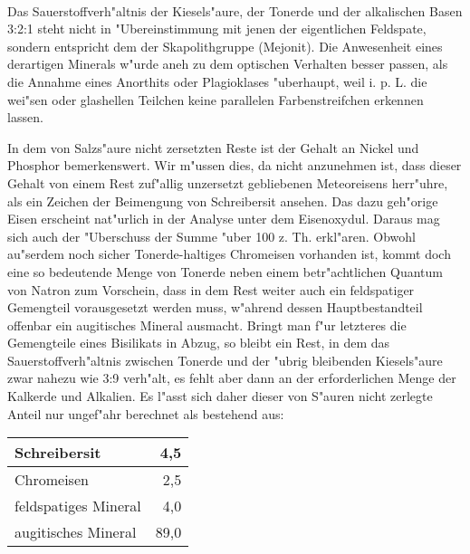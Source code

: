 \documentclass[a4paper, 11pt, oneside]{article}
\begin{document}
\paragraph{}
Das Sauerstoffverh"altnis der Kiesels"aure, der Tonerde und der alkalischen Basen 3:2:1 steht nicht in "Ubereinstimmung mit jenen der eigentlichen Feldspate, sondern entspricht dem der Skapolithgruppe (Mejonit). Die Anwesenheit eines derartigen Minerals w"urde aneh zu dem optischen Verhalten besser passen, als die Annahme eines Anorthits oder Plagioklases "uberhaupt, weil i. p. L. die wei"sen oder glashellen Teilchen keine parallelen Farbenstreifchen erkennen lassen.

In dem von Salzs"aure nicht zersetzten Reste ist der Gehalt an Nickel und Phosphor bemerkenswert. Wir m"ussen dies, da nicht anzunehmen ist, dass dieser Gehalt von einem Rest zuf"allig unzersetzt gebliebenen Meteoreisens herr"uhre, als ein Zeichen der Beimengung von Schreibersit ansehen. Das dazu geh"orige Eisen erscheint nat"urlich in der Analyse unter dem Eisenoxydul. Daraus mag sich auch der "Uberschuss der Summe "uber 100 z. Th. erkl"aren. Obwohl au"serdem noch sicher Tonerde-haltiges Chromeisen vorhanden ist, kommt doch eine so bedeutende Menge von Tonerde neben einem betr"achtlichen Quantum von Natron zum Vorschein, dass in dem Rest weiter auch ein feldspatiger Gemengteil vorausgesetzt werden muss, w"ahrend dessen Hauptbestandteil offenbar ein augitisches Mineral ausmacht. Bringt man f"ur letzteres die Gemengteile eines Bisilikats in Abzug, so bleibt ein Rest, in dem das Sauerstoffverh"altnis zwischen Tonerde und der "ubrig bleibenden Kiesels"aure zwar nahezu wie 3:9 verh"alt, es fehlt aber dann an der erforderlichen Menge der Kalkerde und Alkalien. Es l"asst sich daher dieser von S"auren nicht zerlegte Anteil nur ungef"ahr berechnet als bestehend aus:
\begin{center}
    \begin{tabular}{ |l|r| } 
    \hline
    Schreibersit & 4,5\\\hline
    Chromeisen & 2,5\\\hline
    feldspatiges Mineral & 4,0\\\hline
    augitisches Mineral & 89,0\\
    \hline
    \end{tabular}
\end{center}
\end{document}
